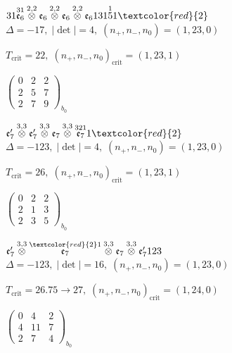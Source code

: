 \documentclass[10pt]{article}
\begin{document}
$31\overset{31}{\mathfrak{e}_6}\overset{2,2}{\otimes}\mathfrak{e}_6\overset{2,2}{\otimes}\mathfrak{e}_6\overset{2,2}{\otimes}\mathfrak{e}_6131\overset{1}{5}1\textcolor{red}{2}$ \quad $\Delta=-17,\; |\det|=4,\; (n_+,n_-,n_0)=(1,23,0)$

\hspace{1em}$T_{\text{crit}}=22,\; (n_+,n_-,n_0)_{\text{crit}}=(1,23,1)$

\hspace{2em}$\left(\begin{smallmatrix}0 & 2 & 2 \\ 2 & 5 & 7 \\ 2 & 7 & 9\end{smallmatrix}\right)_{\!b_0}$

\smallskip

$\mathfrak{e}_7'\overset{3,3}{\otimes}\mathfrak{e}_7'\overset{3,3}{\otimes}\mathfrak{e}_7\overset{3,3}{\otimes}\overset{321}{\mathfrak{e}_7}1\textcolor{red}{2}$ \quad $\Delta=-123,\; |\det|=4,\; (n_+,n_-,n_0)=(1,23,0)$

\hspace{1em}$T_{\text{crit}}=26,\; (n_+,n_-,n_0)_{\text{crit}}=(1,23,1)$

\hspace{2em}$\left(\begin{smallmatrix}0 & 2 & 2 \\ 2 & 1 & 3 \\ 2 & 3 & 5\end{smallmatrix}\right)_{\!b_0}$

\smallskip

$\mathfrak{e}_7'\overset{3,3}{\otimes}\overset{\textcolor{red}{2}1}{\mathfrak{e}_7}\overset{3,3}{\otimes}\mathfrak{e}_7\overset{3,3}{\otimes}\mathfrak{e}_7'123$ \quad $\Delta=-123,\; |\det|=16,\; (n_+,n_-,n_0)=(1,23,0)$

\hspace{1em}$T_{\text{crit}}=26.75 \to 27,\; (n_+,n_-,n_0)_{\text{crit}}=(1,24,0)$

\hspace{2em}$\left(\begin{smallmatrix}0 & 4 & 2 \\ 4 & 11 & 7 \\ 2 & 7 & 4\end{smallmatrix}\right)_{\!b_0}$
\end{document}
